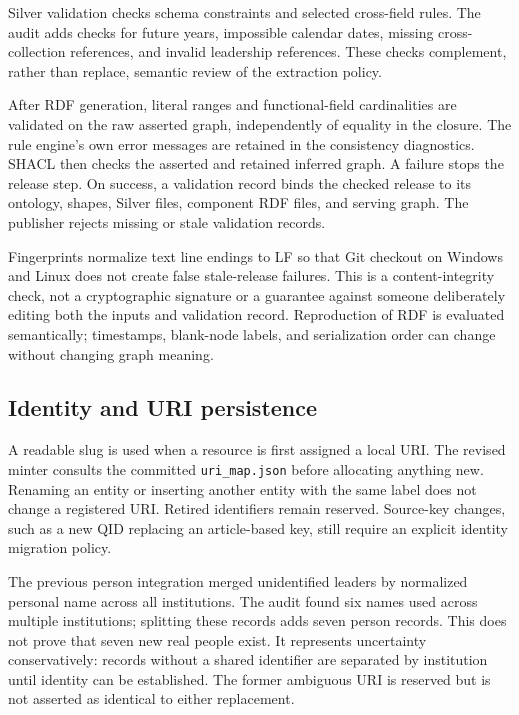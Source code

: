 \documentclass[11pt,a4paper]{article}
\newcommand{\term}[1]{\texttt{#1}}
\begin{document}
Silver validation checks schema constraints and selected cross-field rules. The audit
adds checks for future years, impossible calendar dates, missing cross-collection
references, and invalid leadership references. These checks complement, rather than
replace, semantic review of the extraction policy.

After RDF generation, literal ranges and functional-field cardinalities are validated
on the raw asserted graph, independently of equality in the closure. The rule engine's own error
messages are retained in the consistency diagnostics. SHACL then checks the asserted and
retained inferred graph. A failure stops the release step. On success, a validation record
binds the checked release to its ontology, shapes, Silver files, component RDF files, and
serving graph. The publisher rejects missing or stale validation records.

Fingerprints normalize text line endings to LF so that Git checkout on Windows and Linux
does not create false stale-release failures. This is a content-integrity check, not a
cryptographic signature or a guarantee against someone deliberately editing both the
inputs and validation record. Reproduction of RDF is evaluated semantically; timestamps,
blank-node labels, and serialization order can change without changing graph meaning.

\subsection{Identity and URI persistence}
A readable slug is used when a resource is first assigned a local URI. The revised minter
consults the committed \term{uri\_map.json} before allocating anything new. Renaming an
entity or inserting another entity with the same label does not change a registered URI.
Retired identifiers remain reserved. Source-key changes, such as a new QID replacing an
article-based key, still require an explicit identity migration policy.

The previous person integration merged unidentified leaders by normalized personal name
across all institutions. The audit found six names used across multiple institutions;
splitting these records adds seven person records. This does not prove that seven new
real people exist. It represents uncertainty conservatively: records without a shared
identifier are separated by institution until identity can be established. The former
ambiguous URI is reserved but is not asserted as identical to either replacement.
\end{document}
